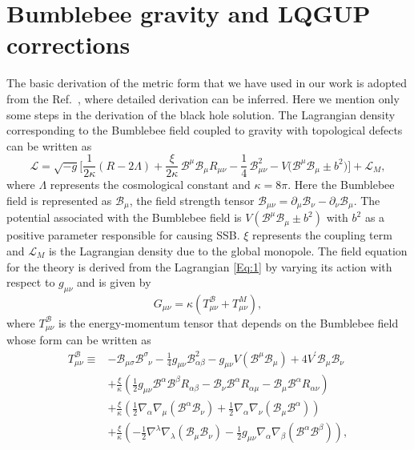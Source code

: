 \documentclass[aps,amsmath,amssymb,showpacs,showkeys]{revtex4}
\begin{document}
\section{Bumblebee gravity and LQGUP corrections}
\label{sec2}
The basic derivation of the metric form that we have used in our work is 
adopted from the Ref.~\cite{20}, where detailed derivation can be inferred. 
Here we mention only some steps in the derivation of the black hole solution.
The Lagrangian density corresponding to the Bumblebee field coupled to gravity 
with topological defects can be written as \cite{20}
\begin{equation}
\mathcal{L}=\sqrt{-g} \bigg[\frac{1}{2\kappa} (R-2\Lambda) +\frac{\xi}{2\kappa} \,\mathcal{B}^{\mu}\mathcal{B}_{\mu}R_{\mu\nu}-\frac{1}{4}\,\mathcal{B}^2_{\mu\nu}-V\big(\mathcal{B}^{\mu}\mathcal{B}_{\mu}\pm b^2\big)\bigg]+\mathcal{L}_{M},
\label{Eq:1}
\end{equation} 
where $\Lambda$ represents the cosmological constant and $\kappa=8\pi$. Here 
the Bumblebee field is represented as $\mathcal{B}_{\mu}$, the field strength 
tensor $\mathcal{B}_{\mu\nu}=\partial_{\mu}\mathcal{B}_{\nu}-\partial_{\nu} 
\mathcal{B}_{\mu}$. The potential associated with the Bumblebee field is 
$V(\mathcal{B}^{\mu}\mathcal{B}_{\mu}\pm b^2)$ with $b^2$ as a positive 
parameter responsible for causing SSB. $\xi$ represents the coupling term and 
$\mathcal{L}_M$ is the Lagrangian density due to the global monopole. 
The field equation for the theory is derived from the Lagrangian \eqref{Eq:1} 
by varying its action with respect to $g_{\mu\nu}$ and is given by
\begin{equation}
G_{\mu\nu}=\kappa \left(T^{\mathcal{B}}_{\mu\nu}+T^{M}_{\mu\nu}\right),
\label{Eq:2}
\end{equation}
where $T^{\mathcal{B}}_{\mu\nu}$ is the energy-momentum tensor that 
depends on the Bumblebee field whose form can be written as \cite{20}
\begin{align}
T_{\mu\nu}^{\mathcal{B}}\equiv & -\mathcal{B}_{\mu\sigma}\mathcal{B}_{\phantom{\sigma}\nu}^{\sigma}-\frac{1}{4}g_{\mu\nu}\mathcal{B}_{\alpha\beta}^{2}-g_{\mu\nu}V\!\left(\mathcal{B}^{\mu}\mathcal{B}_{\mu}\right)+4V^{\prime}\mathcal{B}_{\mu}\mathcal{B}_{\nu}\nonumber \\
 & +\frac{\xi}{\kappa}\left(\frac{1}{2}g_{\mu\nu}\mathcal{B}^{\alpha}\mathcal{B}^{\beta}R_{\alpha\beta}-\mathcal{B}_{\nu}\mathcal{B}^{\alpha}R_{\alpha\mu}-\mathcal{B}_{\mu}\mathcal{B}^{\alpha}R_{\alpha\nu}\right)\nonumber \\
 & +\frac{\xi}{\kappa}\left(\frac{1}{2}\nabla_{\alpha}\nabla_{\mu}\!\left(\mathcal{B}^{\alpha}\mathcal{B}_{\nu}\right)+\frac{1}{2}\nabla_{\alpha}\nabla_{\nu}\!\left(\mathcal{B}_{\mu}\mathcal{B}^{\alpha}\right)\right)\nonumber \\
 & +\frac{\xi}{\kappa}\left(-\frac{1}{2}\nabla^{\lambda}\nabla_{\lambda}\!\left(\mathcal{B}_{\mu}\mathcal{B}_{\nu}\right)-\frac{1}{2}g_{\mu\nu}\nabla_{\alpha}\nabla_{\beta}\!\left(\mathcal{B}^{\alpha}\mathcal{B}^{\beta}\right)\right),\label{T_mn^B}
\end{align}
\end{document}
